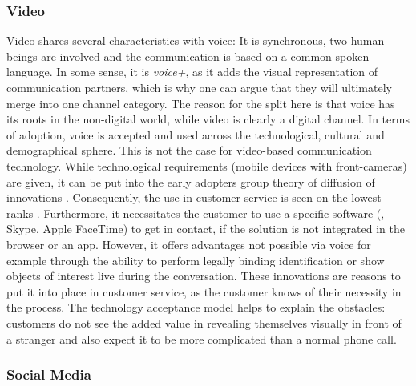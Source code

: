 		\subsubsection{Video}
		Video shares several characteristics with voice: It is synchronous, two human beings are involved and the communication is based on a common spoken language. In some sense, it is \textit{voice+}, as it adds the visual representation of communication partners, which is why one can argue that they will ultimately merge into one channel category. The reason for the split here is that voice has its roots in the non-digital world, while video is clearly a digital channel. In terms of adoption, voice is accepted and used across the technological, cultural and demographical sphere. This is not the case for video-based communication technology. While technological requirements (\ie mobile devices with front-cameras)  are given, it can be put into the early adopters group \wrt theory of diffusion of innovations \citep{rogers2010diffusion}. Consequently, the use in customer service is seen on the lowest ranks \citep{DimensionData2015}.  Furthermore, it necessitates the customer to use a specific software (\eg, Skype, Apple FaceTime) to get in contact, if the solution is not integrated in the browser or an app. However, it offers advantages not possible via voice for example through the ability to perform legally binding identification or show objects of interest live during the conversation. These innovations are reasons to put it into place in customer service, as the customer knows of their necessity in the process. The technology acceptance model \citep{Adams_1992} helps to explain the obstacles: customers do not see the added value in revealing themselves visually in front of a stranger and also expect it to be more complicated than a normal phone call. 
		
		\subsubsection{Social Media}
		
